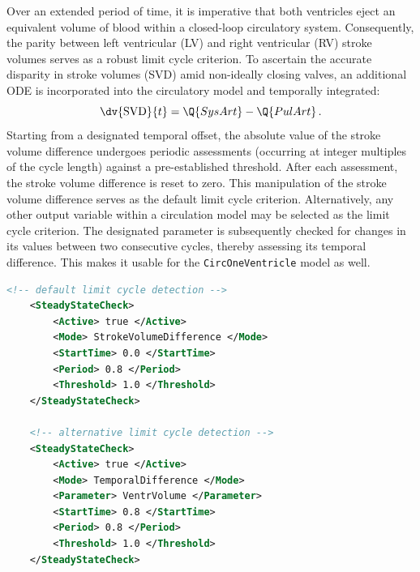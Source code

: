 Over an extended period of time, it is imperative that both ventricles eject an equivalent volume of blood within a closed-loop circulatory system. 
Consequently, the parity between left ventricular (LV) and right ventricular (RV) stroke volumes serves as a robust limit cycle criterion. 
To ascertain the accurate disparity in stroke volumes (SVD) amid non-ideally closing valves, an additional ODE is incorporated into the circulatory model and temporally integrated:
\begin{equation}
    \dv{\mathrm{SVD}}{t} = \Q{SysArt} - \Q{PulArt}\,.
\end{equation}
Starting from a designated temporal offset, the absolute value of the stroke volume difference undergoes periodic assessments (occurring at integer multiples of the cycle length) against a pre-established threshold. 
After each assessment, the stroke volume difference is reset to zero. 
This manipulation of the stroke volume difference serves as the default limit cycle criterion.
Alternatively, any other output variable within a circulation model may be selected as the limit cycle criterion. 
The designated parameter is subsequently checked for changes in its values between two consecutive cycles, thereby assessing its temporal difference.
This makes it usable for the \verb|CircOneVentricle| model as well.

\begin{lstlisting}[language=XML,caption=.xml settings for a limit cycle check for all circulation models (subkey of <Circulation><Circs><Circ\_X>)]
    <!-- default limit cycle detection -->
    <SteadyStateCheck>
        <Active> true </Active>
        <Mode> StrokeVolumeDifference </Mode>
        <StartTime> 0.0 </StartTime>
        <Period> 0.8 </Period>
        <Threshold> 1.0 </Threshold>
    </SteadyStateCheck>

    <!-- alternative limit cycle detection -->
    <SteadyStateCheck>
        <Active> true </Active>
        <Mode> TemporalDifference </Mode>
        <Parameter> VentrVolume </Parameter>
        <StartTime> 0.8 </StartTime>
        <Period> 0.8 </Period>
        <Threshold> 1.0 </Threshold>
    </SteadyStateCheck>
\end{lstlisting}

